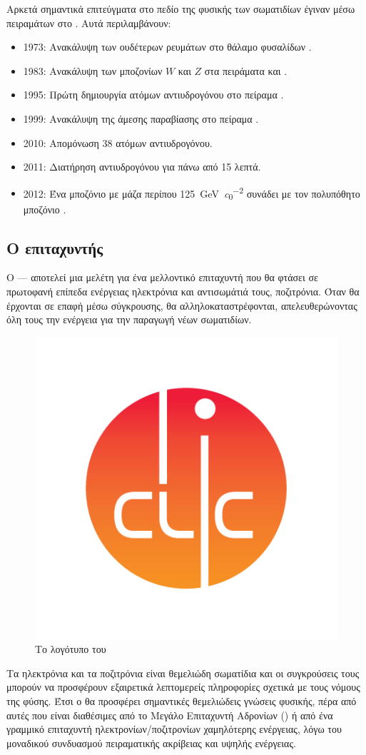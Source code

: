 Αρκετά σημαντικά επιτεύγματα στο πεδίο της φυσικής των σωματιδίων έγιναν μέσω πειραμάτων στο . Αυτά περιλαμβάνουν:
\begin{itemize}
\item 1973: Ανακάλυψη των ουδέτερων ρευμάτων στο θάλαμο φυσαλίδων .
\item 1983: Ανακάλυψη των μποζονίων $W$ και $Z$ στα πειράματα  και .
\item 1995: Πρώτη δημιουργία ατόμων αντιυδρογόνου στο πείραμα .
\item 1999: Ανακάλυψη της άμεσης παραβίασης  στο πείραμα .
\item 2010: Απομόνωση 38 ατόμων αντιυδρογόνου.
\item 2011: Διατήρηση αντιυδρογόνου για πάνω από 15 λεπτά.
\item 2012: Ένα μποζόνιο με μάζα περίπου \SI[per-mode = symbol]{125}{\giga \electronvolt \per  \clight \squared} συνάδει με τον πολυπόθητο μποζόνιο .
\end{itemize}


\subsection{Ο επιταχυντής }


Ο  --- αποτελεί μια μελέτη για ένα μελλοντικό επιταχυντή που θα φτάσει σε πρωτοφανή επίπεδα ενέργειας ηλεκτρόνια και αντισωμάτιά τους, ποζιτρόνια. 
Όταν θα έρχονται σε επαφή μέσω σύγκρουσης, θα αλληλοκαταστρέφονται, απελευθερώνοντας όλη τους την ενέργεια για την παραγωγή νέων σωματιδίων.

\begin{figure}[b]
\includegraphics[trim={12mm 12mm 12mm 12mm},clip=true,width=0.25\linewidth]{images/CLIClogo}
\centering
\caption{Το λογότυπο του }
\label{img:CLIClogo}
\end{figure}

Τα ηλεκτρόνια και τα ποζιτρόνια είναι θεμελιώδη σωματίδια και οι συγκρούσεις τους μπορούν να προσφέρουν εξαιρετικά λεπτομερείς πληροφορίες σχετικά με τους νόμους της φύσης. 
Έτσι ο  θα προσφέρει σημαντικές θεμελιώδεις γνώσεις φυσικής, πέρα από αυτές που είναι διαθέσιμες από το Μεγάλο Επιταχυντή Αδρονίων () ή από ένα γραμμικό επιταχυντή ηλεκτρονίων/ποζιτρονίων χαμηλότερης ενέργειας, λόγω του μοναδικού συνδυασμού πειραματικής ακρίβειας και υψηλής ενέργειας.

